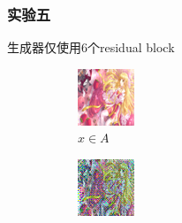 \documentclass{beamer}
\begin{document}
\begin{frame}
\frametitle{实验五}
生成器仅使用6个residual block
\begin{figure}[htb]
    \centering
    \begin{subfigure}[b]{0.23\linewidth}
        \includegraphics[width=\linewidth]{exp5_epoch140_real_A.png}
        \caption{$x \in A$}
      \end{subfigure}
      \begin{subfigure}[b]{0.23\linewidth}
        \includegraphics[width=\linewidth]{exp5_epoch140_fake_B.png}

\end{subfigure}
\end{figure}
\end{frame}
\end{document}
